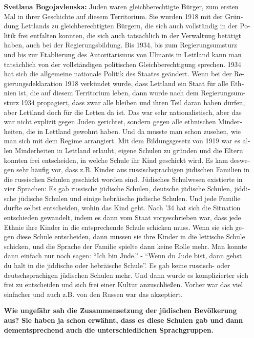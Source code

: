 \begin{otherlanguage}{ngerman}
\textbf{Svetlana Bogojavlenska:} Juden waren gleichberechtigte Bürger, zum ersten Mal in ihrer Geschichte auf diesem Territorium. Sie wurden 1918 mit der Gründung Lettlands zu gleichberechtigten Bürgern, die sich auch vollständig in der Politik frei entfalten konnten, die sich auch tatsächlich in der Verwaltung betätigt haben, auch bei der Regierungsbildung. Bis 1934, bis zum Regierungsumsturz und bis zur Etablierung des Autoritarismus von Ulmanis in Lettland kann man tatsächlich von der vollständigen politischen Gleichberechtigung sprechen.
1934 hat sich die allgemeine nationale Politik des Staates geändert. Wenn bei der Regierungsdeklaration 1918 verkündet wurde, dass Lettland ein Staat für alle Ethnien ist, die auf diesem Territorium leben, dann wurde nach dem Regierungsumsturz 1934 propagiert, dass zwar alle bleiben und ihren Teil daran haben dürfen, aber Lettland doch für die Letten da ist. Das war sehr nationalistisch, aber das war nicht explizit gegen Juden gerichtet, sondern gegen alle ethnischen Minderheiten, die in Lettland gewohnt haben. Und da musste man schon zusehen, wie man sich mit dem Regime arrangiert.
Mit dem Bildungsgesetz von 1919 war es allen Minderheiten in Lettland erlaubt, eigene Schulen zu gründen und die Eltern konnten frei entscheiden, in welche Schule ihr Kind geschickt wird. Es kam deswegen sehr häufig vor, dass z.B. Kinder aus russischsprachigen jüdischen Familien in die russischen Schulen geschickt worden sind. Jüdisches Schulwesen existierte in vier Sprachen: Es gab russische jüdische Schulen, deutsche jüdische Schulen, jiddische jüdische Schulen und einige hebräische jüdische Schulen. Und jede Familie durfte selbst entscheiden, wohin das Kind geht. Nach '34 hat sich die Situation entschieden gewandelt, indem es dann vom Staat vorgeschrieben war, dass jede Ethnie ihre Kinder in die entsprechende Schule schicken muss. Wenn sie sich gegen diese Schule entscheiden, dann müssen sie ihre Kinder in die lettische Schule schicken, und die Sprache der Familie spielte dann keine Rolle mehr. Man konnte dann einfach nur noch sagen: "`Ich bin Jude."' - "`Wenn du Jude bist, dann gehst du halt in die jiddische oder hebräische Schule"'. Es gab keine russisch- oder deutschsprachigen jüdischen Schulen mehr. Und dann wurde es komplizierter sich frei zu entscheiden und sich frei einer Kultur anzuschließen. Vorher war das viel einfacher und auch z.B. von den Russen war das akzeptiert.

\textbf{Wie ungefähr sah die Zusammensetzung der jüdischen Bevölkerung aus? Sie haben ja schon erwähnt, dass es diese Schulen gab und dann dementsprechend auch die unterschiedlichen Sprachgruppen.}


\end{otherlanguage}
